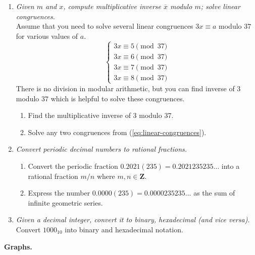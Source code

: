 \documentclass[a4paper,12pt]{article}
\newcommand\Z{\mathbf{Z}}
\begin{document}
\begin{enumerate}
\item {\small \em
Given $m$ and $x$, compute
multiplicative inverse $\overline{x}$ modulo $m$; solve linear congruences.}\\
Assume that you need to solve several linear congruences $3x \equiv a$ modulo $37$ 
for various values of $a$.  
\begin{equation}
\label{eq:linear-congruences}
\left\{ \begin{array}{l}
3x \equiv 5 \pmod{37} \\
3x \equiv 6 \pmod{37} \\
3x \equiv 7 \pmod{37} \\
3x \equiv 8 \pmod{37} 
\end{array} \right. 
\end{equation}
There is no division in modular arithmetic, but you can find inverse of $3$ 
modulo $37$ which is helpful to solve these congruences. 
\begin{enumerate}
\item Find the multiplicative inverse of $3$ modulo $37$. 
\item Solve any two congruences from (\ref{eq:linear-congruences}).
\end{enumerate}



\item {\small \em
Convert periodic decimal numbers to rational fractions.}\\
\begin{enumerate}
\item
Convert the periodic fraction $0.2021(235) = 0.2021235235\ldots$ into a rational 
fraction $m/n$ where $m,n \in \Z$. 
\item
Express the number $0.0000(235) = 0.0000235235\ldots$ as the sum
of infinite geometric series.
\end{enumerate}


\item {\small \em
Given a decimal integer, convert it to binary, hexadecimal (and vice versa).}\\
Convert $1000_{10}$ into binary and hexadecimal notation.
\end{enumerate}





\vspace{10pt}
{\bf Graphs.}
\end{document}
